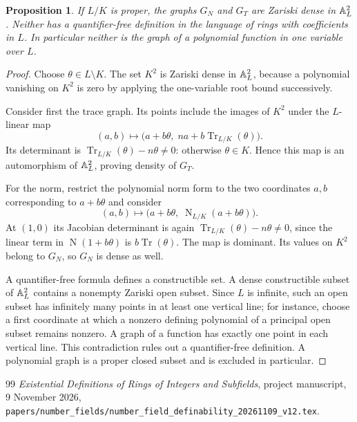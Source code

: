 \documentclass[11pt,a4paper]{article}
\newtheorem{proposition}[theorem]{Proposition}
\theoremstyle{definition}\newtheorem{definition}[theorem]{Definition}
\theoremstyle{remark}\newtheorem{remark}[theorem]{Remark}
\DeclareMathOperator{\Tr}{Tr}\DeclareMathOperator{\Nm}{N}
\begin{document}
\begin{proposition}\label{prop:dense}
If $L/K$ is proper, the graphs $G_N$ and $G_T$ are Zariski dense
in $\mathbb A^2_L$. Neither has a quantifier-free definition in the
language of rings with coefficients in $L$. In particular neither
is the graph of a polynomial function in one variable over $L$.
\end{proposition}
\begin{proof}
Choose $\theta\in L\setminus K$. The set $K^2$ is Zariski dense
in $\mathbb A^2_L$, because a polynomial vanishing on $K^2$ is zero by
applying the one-variable root bound successively.

Consider first the trace graph. Its points include the images of
$K^2$ under the $L$-linear map
\[
    (a,b)\longmapsto
        \bigl(a+b\theta,\;na+b\Tr_{L/K}(\theta)\bigr).
\]
Its determinant is $\Tr_{L/K}(\theta)-n\theta\ne0$:
otherwise $\theta\in K$. Hence this map is an automorphism of
$\mathbb A^2_L$, proving density of $G_T$.

For the norm, restrict the polynomial norm form to the two
coordinates $a,b$ corresponding to $a+b\theta$ and consider
\[
        (a,b)\longmapsto
          \bigl(a+b\theta,\;\Nm_{L/K}(a+b\theta)\bigr).
\]
At $(1,0)$ its Jacobian determinant is again
$\Tr_{L/K}(\theta)-n\theta\ne0$, since the linear term in
$\Nm(1+b\theta)$ is $b\Tr(\theta)$. The map is dominant.
Its values on $K^2$ belong to $G_N$, so $G_N$ is dense as well.

A quantifier-free formula defines a constructible set. A dense
constructible subset of $\mathbb A^2_L$ contains a nonempty Zariski
open subset. Since $L$ is infinite, such an open subset has
infinitely many points in at least one vertical line; for instance,
choose a first coordinate at which a nonzero defining polynomial
of a principal open subset remains nonzero. A graph of a function
has exactly one point in each vertical line. This contradiction
rules out a quantifier-free definition. A polynomial graph is a
proper closed subset and is excluded in particular.
\end{proof}

\begin{thebibliography}{99}
\emph{Existential Definitions of Rings of Integers and Subfields},
project manuscript, 9 November 2026,
\nolinkurl{papers/number_fields/number_field_definability_20261109_v12.tex}.
\end{thebibliography}
\end{document}
